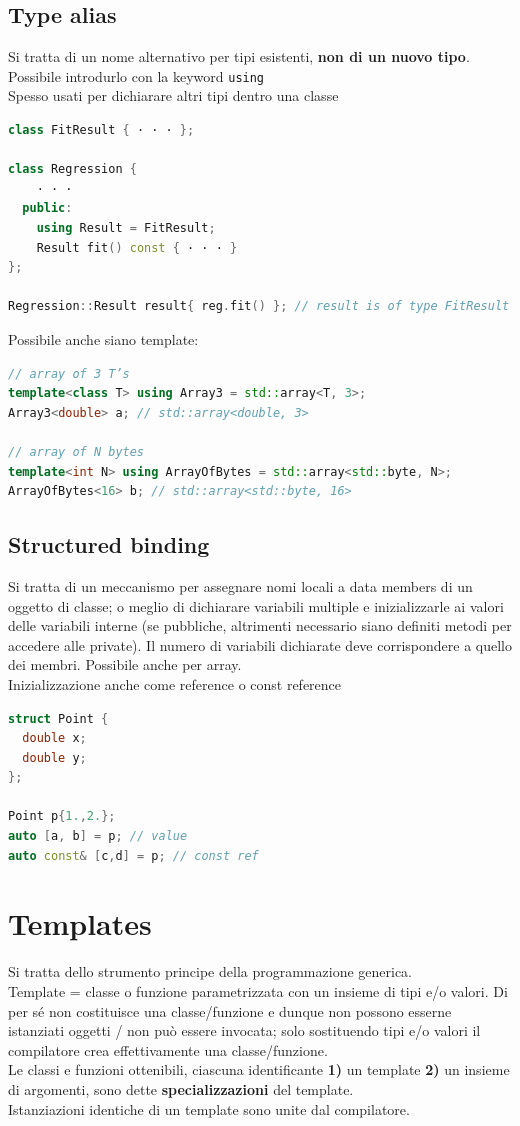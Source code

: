 \documentclass[10pt, oneside]{book}
\begin{document}
\section{Type alias}
Si tratta di un nome alternativo per tipi esistenti, \textbf{non di un nuovo tipo}. Possibile introdurlo con la keyword \texttt{using}\\
Spesso usati per dichiarare altri tipi dentro una classe
\begin{lstlisting}[language=C++]
class FitResult { · · · };

class Regression {
    · · ·
  public:
    using Result = FitResult;
    Result fit() const { · · · }
};

Regression::Result result{ reg.fit() }; // result is of type FitResult
\end{lstlisting}
Possibile anche siano template:
\begin{lstlisting}[language=C++]
// array of 3 T’s
template<class T> using Array3 = std::array<T, 3>;
Array3<double> a; // std::array<double, 3>

// array of N bytes
template<int N> using ArrayOfBytes = std::array<std::byte, N>;
ArrayOfBytes<16> b; // std::array<std::byte, 16>
\end{lstlisting}


\section{Structured binding}
Si tratta di un meccanismo per assegnare nomi locali a data members di un oggetto di classe; o meglio di dichiarare variabili multiple e inizializzarle ai valori delle variabili interne (se pubbliche, altrimenti necessario siano definiti metodi per accedere alle private). Il numero di variabili dichiarate deve corrispondere a quello dei membri. Possibile anche per array.\\
Inizializzazione anche come reference o const reference
\begin{lstlisting}[language=C++]
struct Point {
  double x;
  double y;
};

Point p{1.,2.};
auto [a, b] = p; // value
auto const& [c,d] = p; // const ref
\end{lstlisting}

\chapter{Templates}
Si tratta dello strumento principe della programmazione generica.\\
Template = classe o funzione parametrizzata con un insieme di tipi e/o valori. Di per sé non costituisce una classe/funzione e dunque non possono esserne istanziati oggetti / non può essere invocata; solo sostituendo tipi e/o valori il compilatore crea effettivamente una classe/funzione.\\
Le classi e funzioni ottenibili, ciascuna identificante \textbf{1)} un template \textbf{2)} un insieme di argomenti, sono dette \textbf{specializzazioni} del template. \\
Istanziazioni identiche di un template sono unite dal compilatore.
\end{document}
